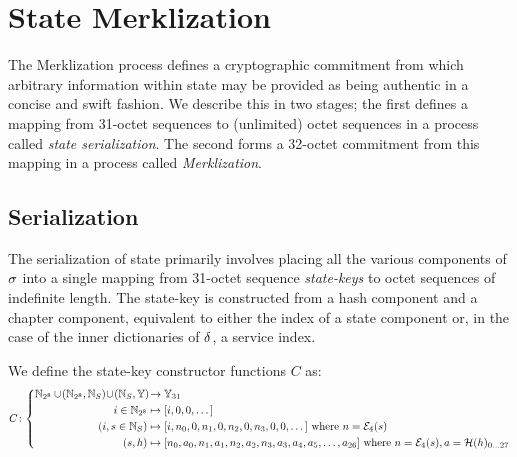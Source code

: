 \section{State Merklization}\label{sec:statemerklization}

The Merklization process defines a cryptographic commitment from which arbitrary information within state may be provided as being authentic in a concise and swift fashion. We describe this in two stages; the first defines a mapping from 31-octet sequences to (unlimited) octet sequences in a process called \emph{state serialization}. The second forms a 32-octet commitment from this mapping in a process called \emph{Merklization}.

\subsection{Serialization}

The serialization of state primarily involves placing all the various components of $\sigma$ into a single mapping from 31-octet sequence \emph{state-keys} to octet sequences of indefinite length. The state-key is constructed from a hash component and a chapter component, equivalent to either the index of a state component or, in the case of the inner dictionaries of $\delta$, a service index.

We define the state-key constructor functions $C$ as:
\begin{equation}
  C\colon\abracegroup{
    \Nbits{8} \cup \tup{\Nbits{8}, \serviceid} \cup \tup{\serviceid, \blob} &\to \bloboflen{31} \\
    i \in \Nbits{8} &\mapsto [i, 0, 0, \dots] \\
    (i, s \in \serviceid) &\mapsto [i, n_0, 0, n_1, 0, n_2, 0, n_3, 0, 0, \dots]\ \where n = \fixedencode{4}{s} \\
    (s, h) &\mapsto [n_0, a_0, n_1, a_1, n_2, a_2, n_3, a_3, a_4, a_5, \dots, a_{26}]\ \where n = \fixedencode{4}{s}, a = \blake(h)\interval{0}{27}
  }
\end{equation}

